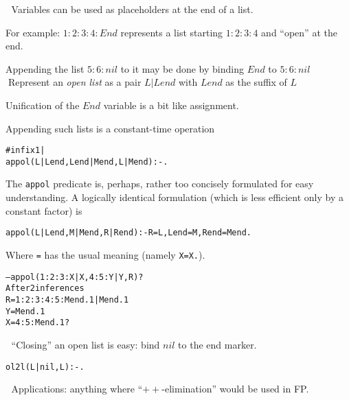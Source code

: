 \documentclass{popl}
\def\user#1{{#1}}
\newenvironment{smalltt}{\begin{alltt}\smaller}{\end{alltt}}
\begin{document}
\begin{foil}
\begin{note}
\end{note}

Variables can be used as placeholders at the end of a list.

For example: $1:2:3:4:End$ represents a list starting $1:2:3:4$ and ``open'' at the end.

Appending the list $5:6:nil$ to it may be done by binding $End$ to $5:6:nil$

Represent an {\it open list} as a pair $L|Lend$ with $Lend$ as the suffix of $L$

Unification of the $End$ variable is a bit like assignment.

Appending such lists is a constant-time operation
\begin{smalltt}
        #infix1 |
        appol(L|Lend, Lend|Mend, L|Mend) :- .
\end{smalltt}
\begin{note}
The {\tt appol} predicate is, perhaps, rather too concisely formulated for
easy understanding. A logically identical formulation (which is  less
efficient only by a constant factor) is
\begin{alltt}
        appol(L|Lend, M|Mend, R|Rend) :- R=L, Lend=M, Rend=Mend.
\end{alltt}

Where {\tt =} has the usual meaning (namely {\tt X=X.}).

\end{note}

\begin{smalltt}
        -- \user{appol(1:2:3:X|X, 4:5:Y|Y, R)?}
        After 2 inferences 
        R = 1 : 2 : 3 : 4 : 5 : Mend.1 | Mend.1 
        Y = Mend.1 
        X = 4 : 5 : Mend.1 ? 
\end{smalltt}

``Closing'' an open list is easy: bind $nil$ to the end marker.
\begin{smalltt}
        ol2l(L|nil, L) :- .
\end{smalltt}

Applications: anything where ``$++$-elimination'' would be used in FP.
\end{foil}
\end{document}
